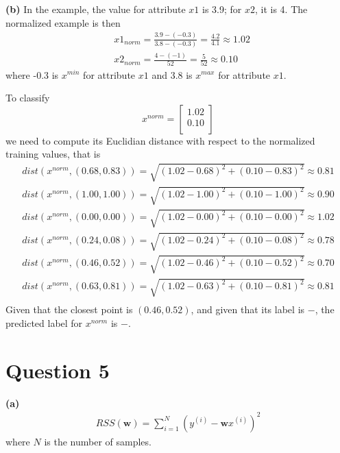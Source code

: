 \documentclass[leqno]{article}
\begin{document}
\hfill

\noindent \textbf{(b)} In the example, the value for attribute $x1$ is 3.9; for $x2$, it is 4. The normalized example is then
\begin{equation*}
\begin{split}
&x1_{norm} = \frac{3.9 - (-0.3)}{3.8 - (-0.3)} = \frac{4.2}{4.1} \approx 1.02\\
&x2_{norm} = \frac{4 - (-1)}{52} = \frac{5}{52} \approx 0.10
\end{split}
\end{equation*} 
where -0.3 is $x^{min}$ for attribute $x1$ and 3.8 is $x^{max}$ for attribute $x1$.

\noindent To classify 
\[
x^{norm}=
  \begin{bmatrix}
     1.02\\
     0.10\\
  \end{bmatrix}
\]
we need to compute its Euclidian distance with respect to the normalized training values, that is
\begin{equation*}
\begin{split}
dist(x^{norm}, (0.68, 0.83)) = \sqrt{(1.02 - 0.68)^2 + (0.10 - 0.83)^2} \approx 0.81\\
dist(x^{norm}, (1.00, 1.00)) = \sqrt{(1.02 - 1.00)^2 + (0.10 - 1.00)^2} \approx 0.90\\
dist(x^{norm}, (0.00, 0.00)) = \sqrt{(1.02 - 0.00)^2 + (0.10 - 0.00)^2} \approx 1.02\\
dist(x^{norm}, (0.24, 0.08)) = \sqrt{(1.02 - 0.24)^2 + (0.10 - 0.08)^2} \approx 0.78\\
dist(x^{norm}, (0.46, 0.52)) = \sqrt{(1.02 - 0.46)^2 + (0.10 - 0.52)^2} \approx 0.70\\
dist(x^{norm}, (0.63, 0.81)) = \sqrt{(1.02 - 0.63)^2 + (0.10 - 0.81)^2} \approx 0.81\\ 
\end{split}
\end{equation*} 
Given that the closest point is $(0.46, 0.52)$, and given that its label is $-$, the predicted label for $x^{norm}$ is $-$.

\hfill

\section*{Question 5} \textbf{(a)} 
\begin{equation*}
\begin{split}
RSS(\textbf{w}) = \sum_{i=1}^{N}(y^{(i)} - \textbf{w}x^{(i)})^2
\end{split}
\end{equation*} 
where $N$ is the number of samples.
\end{document}
